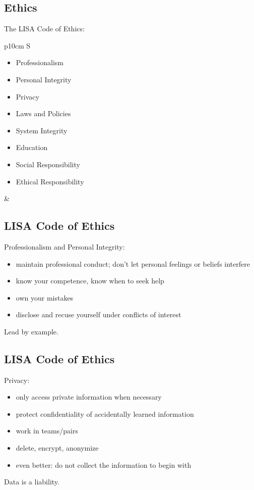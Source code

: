 \documentclass[xga]{xdvislides}
\begin{document}
\subsection{Ethics}
The LISA Code of Ethics:
\\

\begin{tabular}{ p{10cm} S }
\begin{itemize}
	\item Professionalism
	\item Personal Integrity
	\item Privacy
	\item Laws and Policies
	\item System Integrity
	\item Education
	\item Social Responsibility
	\item Ethical Responsibility
\end{itemize}
&  \\
\end{tabular}

\subsection{LISA Code of Ethics}
Professionalism and Personal Integrity:

\begin{itemize}
	\item maintain professional conduct; don't let
personal feelings or beliefs interfere
	\item know your competence, know when to seek help
	\item own your mistakes
	\item disclose and recuse yourself under conflicts of interest
\end{itemize}
\vspace{.5in}
Lead by example.


\subsection{LISA Code of Ethics}
Privacy:
\begin{itemize}
	\item only access private information when necessary
	\item protect confidentiality of accidentally learned information
	\item work in teams/pairs
	\item delete, encrypt, anonymize
	\item even better: do not collect the information to begin with
\end{itemize}
\vspace{.5in}
Data is a liability.
\end{document}
